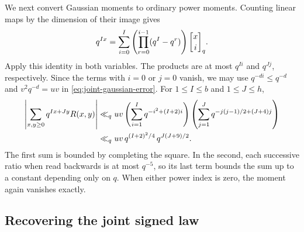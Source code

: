 We next convert Gaussian moments to ordinary power moments. Counting
linear maps by the dimension of their image gives
\[
 q^{Ix}=\sum_{i=0}^{I}
       \left(\prod_{r=0}^{i-1}(q^I-q^r)\right)\qbin{x}{i}.
\]
Apply this identity in both variables. The products are at most $q^{Ii}$
and $q^{Jj}$, respectively. Since the terms with $i=0$ or $j=0$ vanish,
we may use $q^{-di}\le q^{-d}$ and $v^2q^{-d}=uv$ in
\eqref{eq:joint-gaussian-error}. For $1\le I\le b$ and $1\le J\le h$,
\begin{align}
 \left|\sum_{x,y\ge0}q^{Ix+Jy}R(x,y)\right|
 &\ll_q uv
   \left(\sum_{i=1}^{I}q^{-i^2+(I+2)i}\right)
   \left(\sum_{j=1}^{J}q^{-j(j-1)/2+(J+4)j}\right)\notag\\
 &\ll_q uv\,q^{(I+2)^2/4}\,q^{J(J+9)/2}.
 \label{eq:joint-power-error}
\end{align}
The first sum is bounded by completing the square. In the second, each
successive ratio when read backwards is at most $q^{-5}$, so its last
term bounds the sum up to a constant depending only on $q$. When either
power index is zero, the moment again vanishes exactly.

\subsection{Recovering the joint signed law}


